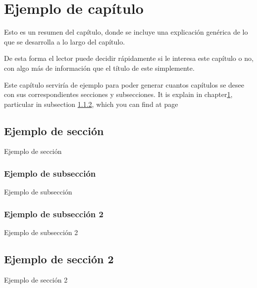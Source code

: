 \chapter{Ejemplo de capítulo}\label{example}
\begin{chapter_resume}
Esto es un resumen del capítulo, donde se incluye una explicación genérica de lo que se desarrolla a lo largo del capítulo.
\vspace{0.7cm}

De esta forma el lector puede decidir rápidamente si le interesa este capítulo o no, con algo más de información que el título de este simplemente.
\end{chapter_resume}
Este capítulo serviría de ejemplo para poder generar cuantos capítulos se desee con sus correspondientes secciones y subsecciones.
It is explain in chapter\ref{example}, particular in subsection \ref{otherexample}, which you can find at page \pageref{otherexample}
\section{Ejemplo de sección}
Ejemplo de sección
\subsection{Ejemplo de subsección}
Ejemplo de subsección
\subsection{Ejemplo de subsección 2}\label{otherexample}
Ejemplo de subsección 2
\section{Ejemplo de sección 2}
Ejemplo de sección 2